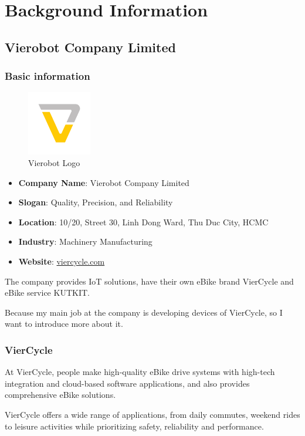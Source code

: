 \section{Background Information}
\subsection{Vierobot Company Limited}
\subsubsection {Basic information}
\begin{figure}[H]
	\centering
	\includegraphics[width = 0.25\textwidth]{images/vierobot_logo.png}
	\caption{Vierobot Logo}
\end{figure}
\begin{itemize}
	\item \textbf{Company Name}: Vierobot Company Limited
	\item \textbf{Slogan}: Quality, Precision, and Reliability
	\item \textbf{Location}: 10/20, Street 30, Linh Dong Ward, Thu Duc City, HCMC
	\item \textbf{Industry}: Machinery Manufacturing
	\item \textbf{Website}: \href{https://viercycle.com/}{viercycle.com}
\end{itemize}

The company provides IoT solutions, have their own eBike brand VierCycle and eBike service KUTKIT.

Because my main job at the company is developing devices of VierCycle, so I want to introduce more about it.

\subsubsection{VierCycle}

At VierCycle, people make high-quality eBike drive systems with high-tech integration and cloud-based software applications, and also provides comprehensive eBike solutions\cite{viercycle}.

VierCycle offers a wide range of applications, from daily commutes, weekend rides to leisure activities while prioritizing safety, reliability and performance.

